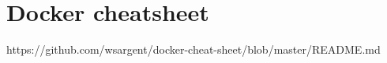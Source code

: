 \chapter{Docker cheatsheet}\label{ANX:csd}

https://github.com/wsargent/docker-cheat-sheet/blob/master/README.md